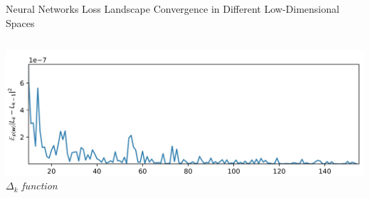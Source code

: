 \documentclass[10pt]{beamer}
\begin{document}
\begin{frame}{Neural Networks Loss Landscape Convergence in Different Low-Dimensional Spaces}
\begin{columns}[t]
        \centering
        \vspace*{-3.3cm}
        \hspace*{-2.2cm}
        \includegraphics[width=1.6\textwidth]{img/D_32.jpg}\\
        \hspace*{-1.2cm}
        \scriptsize \textit{$\Delta_k$ function}
    \end{columns}

\end{frame}
\end{document}
